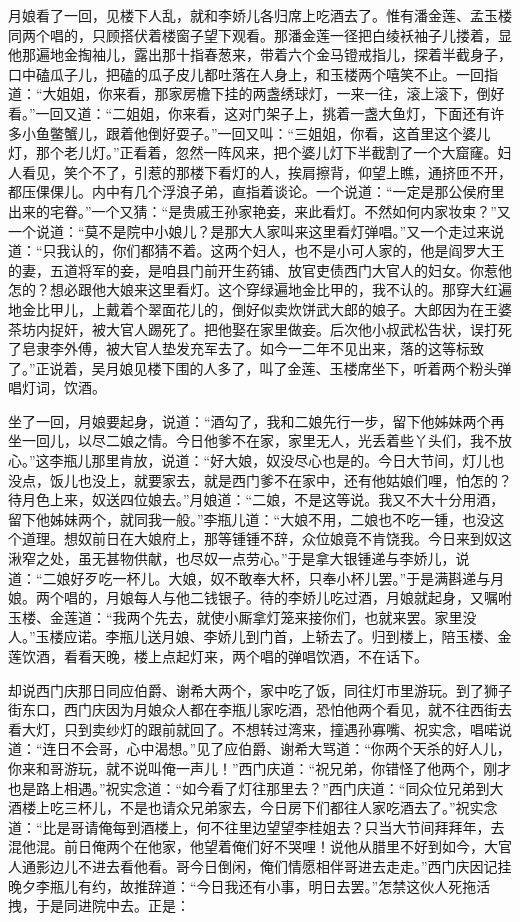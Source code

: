 月娘看了一回，见楼下人乱，就和李娇儿各归席上吃酒去了。惟有潘金莲、孟玉楼同两个唱的，只顾搭伏着楼窗子望下观看。那潘金莲一径把白绫袄袖子儿搂着，显他那遍地金掏袖儿，露出那十指春葱来，带着六个金马镫戒指儿，探着半截身子，口中磕瓜子儿，把磕的瓜子皮儿都吐落在人身上，和玉楼两个嘻笑不止。一回指道：“大姐姐，你来看，那家房檐下挂的两盏绣球灯，一来一往，滚上滚下，倒好看。”一回又道：“二姐姐，你来看，这对门架子上，挑着一盏大鱼灯，下面还有许多小鱼鳖蟹儿，跟着他倒好耍子。”一回又叫：“三姐姐，你看，这首里这个婆儿灯，那个老儿灯。”正看着，忽然一阵风来，把个婆儿灯下半截割了一个大窟窿。妇人看见，笑个不了，引惹的那楼下看灯的人，挨肩擦背，仰望上瞧，通挤匝不开，都压倮倮儿。内中有几个浮浪子弟，直指着谈论。一个说道：“一定是那公侯府里出来的宅眷。”一个又猜：“是贵戚王孙家艳妾，来此看灯。不然如何内家妆束？”又一个说道：“莫不是院中小娘儿？是那大人家叫来这里看灯弹唱。”又一个走过来说道：“只我认的，你们都猜不着。这两个妇人，也不是小可人家的，他是阎罗大王的妻，五道将军的妾，是咱县门前开生药铺、放官吏债西门大官人的妇女。你惹他怎的？想必跟他大娘来这里看灯。这个穿绿遍地金比甲的，我不认的。那穿大红遍地金比甲儿，上戴着个翠面花儿的，倒好似卖炊饼武大郎的娘子。大郎因为在王婆茶坊内捉奸，被大官人踢死了。把他娶在家里做妾。后次他小叔武松告状，误打死了皂隶李外傅，被大官人垫发充军去了。如今一二年不见出来，落的这等标致了。”正说着，吴月娘见楼下围的人多了，叫了金莲、玉楼席坐下，听着两个粉头弹唱灯词，饮酒。

坐了一回，月娘要起身，说道：“酒勾了，我和二娘先行一步，留下他姊妹两个再坐一回儿，以尽二娘之情。今日他爹不在家，家里无人，光丢着些丫头们，我不放心。”这李瓶儿那里肯放，说道：“好大娘，奴没尽心也是的。今日大节间，灯儿也没点，饭儿也没上，就要家去，就是西门爹不在家中，还有他姑娘们哩，怕怎的？待月色上来，奴送四位娘去。”月娘道：“二娘，不是这等说。我又不大十分用酒，留下他姊妹两个，就同我一般。”李瓶儿道：“大娘不用，二娘也不吃一锺，也没这个道理。想奴前日在大娘府上，那等锺锺不辞，众位娘竟不肯饶我。今日来到奴这湫窄之处，虽无甚物供献，也尽奴一点劳心。”于是拿大银锺递与李娇儿，说道：“二娘好歹吃一杯儿。大娘，奴不敢奉大杯，只奉小杯儿罢。”于是满斟递与月娘。两个唱的，月娘每人与他二钱银子。待的李娇儿吃过酒，月娘就起身，又嘱咐玉楼、金莲道：“我两个先去，就使小厮拿灯笼来接你们，也就来罢。家里没人。”玉楼应诺。李瓶儿送月娘、李娇儿到门首，上轿去了。归到楼上，陪玉楼、金莲饮酒，看看天晚，楼上点起灯来，两个唱的弹唱饮酒，不在话下。

却说西门庆那日同应伯爵、谢希大两个，家中吃了饭，同往灯市里游玩。到了狮子街东口，西门庆因为月娘众人都在李瓶儿家吃酒，恐怕他两个看见，就不往西街去看大灯，只到卖纱灯的跟前就回了。不想转过湾来，撞遇孙寡嘴、祝实念，唱喏说道：“连日不会哥，心中渴想。”见了应伯爵、谢希大骂道：“你两个天杀的好人儿，你来和哥游玩，就不说叫俺一声儿！”西门庆道：“祝兄弟，你错怪了他两个，刚才也是路上相遇。”祝实念道：“如今看了灯往那里去？”西门庆道：“同众位兄弟到大酒楼上吃三杯儿，不是也请众兄弟家去，今日房下们都往人家吃酒去了。”祝实念道：“比是哥请俺每到酒楼上，何不往里边望望李桂姐去？只当大节间拜拜年，去混他混。前日俺两个在他家，他望着俺们好不哭哩！说他从腊里不好到如今，大官人通影边儿不进去看他看。哥今日倒闲，俺们情愿相伴哥进去走走。”西门庆因记挂晚夕李瓶儿有约，故推辞道：“今日我还有小事，明日去罢。”怎禁这伙人死拖活拽，于是同进院中去。正是：

